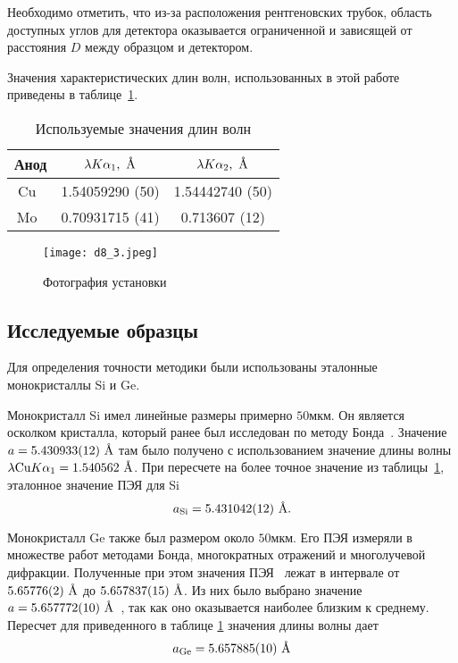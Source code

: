 Необходимо отметить, что из-за расположения рентгеновских трубок, область доступных углов для детектора оказывается ограниченной и зависящей от расстояния $D$ между образцом и детектором.

Значения характеристических длин волн, использованных в этой работе приведены в таблице~\ref{tab:wavelengths}.

\begin{table}[h]
    \centering
    \begin{tabular}{|c|c|c|}
        \hline
        Анод & $\lambda K\alpha_1,\ \text{\AA}$ & $\lambda K\alpha_2,\ \text{\AA}$ \\
        \hline
        Cu~\cite{Holzer:1997} & 1.54059290 (50) & 1.54442740 (50) \\
        Mo~\cite{Deslattes:1985} & 0.70931715 (41) & 0.713607 (12) \\
        \hline
    \end{tabular}
    \caption{Используемые значения длин волн}%
    \label{tab:wavelengths}
\end{table}

\begin{figure}[h]
    \centering
    \texttt{[image: d8\_3.jpeg]}
    \caption{Фотография установки}%
    \label{fig:D8_photo}
\end{figure}

\subsection{Исследуемые образцы}
Для определения точности методики были использованы эталонные монокристаллы Si и Ge.

Монокристалл Si имел линейные размеры примерно $50 \unit{мкм}$.
Он является осколком кристалла, который ранее был исследован по методу Бонда~\cite{Lisoivan:1982}.
Значение $a = 5.430933(12)\ \text{\AA}$ там было получено с использованием значение длины волны $\lambda \text{Cu} K \alpha_1 = 1.540562\ \text{\AA}$.
При пересчете на более точное значение из таблицы~\ref{tab:wavelengths}, эталонное значение ПЭЯ для Si
\[ a_\text{Si} = 5.431042 (12)\ \text{\AA}. \]

Монокристалл Ge также был размером около $50 \unit{мкм}$.
Его ПЭЯ измеряли в множестве работ методами Бонда, многократных отражений и многолучевой дифракции.
Полученные при этом значения ПЭЯ~\cite{Lisoivan:1982} лежат в интервале от $5.65776 (2) \ \text{\AA}$ до $5.657837 (15) \ \text{\AA}$.
Из них было выбрано значение $a = 5.657772 (10) \ \text{\AA}$~\cite{Cooper:1962}, так как оно оказывается наиболее близким к среднему.
Пересчет для приведенного в таблице \ref{tab:wavelengths} значения длины волны дает
\[ a_\text{Ge} = 5.657885 (10)\ \text{\AA} \]

